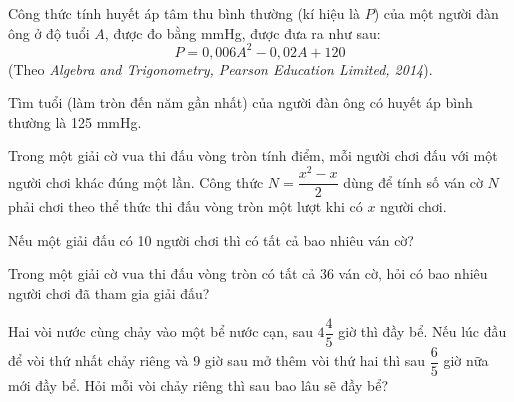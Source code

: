 \begin{practice}
\begin{questions}[resume=SBT]
        \answerline
        \answerline
        \answerline

        \item Công thức tính huyết áp tâm thu bình thường (kí hiệu là $P$) của một người đàn ông ở độ tuổi $A$, được đo bằng mmHg, được đưa ra như sau:
        \[
            P=0{,}006A^2-0{,}02A+120
        \]
        (Theo \textit{Algebra and Trigonometry, Pearson Education Limited, 2014}).

        Tìm tuổi (làm tròn đến năm gần nhất) của người đàn ông có huyết áp bình thường là 125 mmHg.

        \answerline
        \answerline
        \answerline

        \item Trong một giải cờ vua thi đấu vòng tròn tính điểm, mỗi người chơi đấu với một người chơi khác đúng một lần. Công thức $N=\dfrac{x^2-x}{2}$ dùng để tính số ván cờ $N$ phải chơi theo thể thức thi đấu vòng tròn một lượt khi có $x$ người chơi.
        \begin{questions}
            \item Nếu một giải đấu có 10 người chơi thì có tất cả bao nhiêu ván cờ?
            \item Trong một giải cờ vua thi đấu vòng tròn có tất cả 36 ván cờ, hỏi có bao nhiêu người chơi đã tham gia giải đấu?
        \end{questions}

        \answerline
        \answerline
        \answerline

        \item Hai vòi nước cùng chảy vào một bể nước cạn, sau $4\dfrac{4}{5}$ giờ thì đầy bể. Nếu lúc đầu để vòi thứ nhất chảy riêng và 9 giờ sau mở thêm vòi thứ hai thì sau $\dfrac{6}{5}$ giờ nữa mới đầy bể. Hỏi mỗi vòi chảy riêng thì sau bao lâu sẽ đầy bể?

        \answerline
        \answerline
        \answerline
    \end{questions}
\end{practice}
